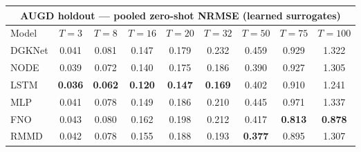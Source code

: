 \begin{tabular}{lcccccccc}
\toprule
\multicolumn{9}{c}{AUGD holdout --- pooled zero-shot NRMSE (learned surrogates)} \\
\midrule
Model & $T{=}3$ & $T{=}8$ & $T{=}16$ & $T{=}20$ & $T{=}32$ & $T{=}50$ & $T{=}75$ & $T{=}100$ \\
\midrule
DGKNet & 0.041 & 0.081 & 0.147 & 0.179 & 0.232 & 0.459 & 0.929 & 1.322 \\
NODE & 0.039 & 0.072 & 0.140 & 0.175 & 0.186 & 0.390 & 0.927 & 1.305 \\
LSTM & \textbf{0.036} & \textbf{0.062} & \textbf{0.120} & \textbf{0.147} & \textbf{0.169} & 0.402 & 0.910 & 1.241 \\
MLP & 0.041 & 0.078 & 0.149 & 0.186 & 0.210 & 0.445 & 0.971 & 1.337 \\
FNO & 0.043 & 0.080 & 0.162 & 0.198 & 0.212 & 0.417 & \textbf{0.813} & \textbf{0.878} \\
RMMD & 0.042 & 0.078 & 0.155 & 0.188 & 0.193 & \textbf{0.377} & 0.895 & 1.307 \\
\bottomrule
\end{tabular}
